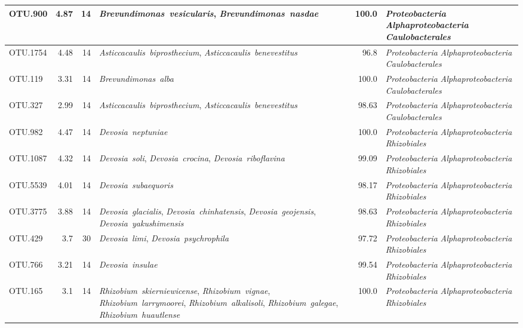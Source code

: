 \begin{ThreePartTable}
\begin{longtable}{lrrP{5cm}rP{5cm}}
OTU.900 & 4.87 & 14 & \mbox{\textit{Brevundimonas vesicularis}}, \mbox{\textit{Brevundimonas nasdae}} & 100.0 & \mbox{\textit{Proteobacteria}} \mbox{\textit{Alphaproteobacteria}} \mbox{\textit{Caulobacterales}} \\ \midrule
OTU.1754 & 4.48 & 14 & \mbox{\textit{Asticcacaulis biprosthecium}}, \mbox{\textit{Asticcacaulis benevestitus}} & 96.8 & \mbox{\textit{Proteobacteria}} \mbox{\textit{Alphaproteobacteria}} \mbox{\textit{Caulobacterales}} \\ \midrule
OTU.119 & 3.31 & 14 & \mbox{\textit{Brevundimonas alba}} & 100.0 & \mbox{\textit{Proteobacteria}} \mbox{\textit{Alphaproteobacteria}} \mbox{\textit{Caulobacterales}} \\ \midrule
OTU.327 & 2.99 & 14 & \mbox{\textit{Asticcacaulis biprosthecium}}, \mbox{\textit{Asticcacaulis benevestitus}} & 98.63 & \mbox{\textit{Proteobacteria}} \mbox{\textit{Alphaproteobacteria}} \mbox{\textit{Caulobacterales}} \\ \midrule
OTU.982 & 4.47 & 14 & \mbox{\textit{Devosia neptuniae}} & 100.0 & \mbox{\textit{Proteobacteria}} \mbox{\textit{Alphaproteobacteria}} \mbox{\textit{Rhizobiales}} \\ \midrule
OTU.1087 & 4.32 & 14 & \mbox{\textit{Devosia soli}}, \mbox{\textit{Devosia crocina}}, \mbox{\textit{Devosia riboflavina}} & 99.09 & \mbox{\textit{Proteobacteria}} \mbox{\textit{Alphaproteobacteria}} \mbox{\textit{Rhizobiales}} \\ \midrule
OTU.5539 & 4.01 & 14 & \mbox{\textit{Devosia subaequoris}} & 98.17 & \mbox{\textit{Proteobacteria}} \mbox{\textit{Alphaproteobacteria}} \mbox{\textit{Rhizobiales}} \\ \midrule
OTU.3775 & 3.88 & 14 & \mbox{\textit{Devosia glacialis}}, \mbox{\textit{Devosia chinhatensis}}, \mbox{\textit{Devosia geojensis}}, \mbox{\textit{Devosia yakushimensis}} & 98.63 & \mbox{\textit{Proteobacteria}} \mbox{\textit{Alphaproteobacteria}} \mbox{\textit{Rhizobiales}} \\ \midrule
OTU.429 & 3.7 & 30 & \mbox{\textit{Devosia limi}}, \mbox{\textit{Devosia psychrophila}} & 97.72 & \mbox{\textit{Proteobacteria}} \mbox{\textit{Alphaproteobacteria}} \mbox{\textit{Rhizobiales}} \\ \midrule
OTU.766 & 3.21 & 14 & \mbox{\textit{Devosia insulae}} & 99.54 & \mbox{\textit{Proteobacteria}} \mbox{\textit{Alphaproteobacteria}} \mbox{\textit{Rhizobiales}} \\ \midrule
OTU.165 & 3.1 & 14 & \mbox{\textit{Rhizobium skierniewicense}}, \mbox{\textit{Rhizobium vignae}}, \mbox{\textit{Rhizobium larrymoorei}}, \mbox{\textit{Rhizobium alkalisoli}}, \mbox{\textit{Rhizobium galegae}}, \mbox{\textit{Rhizobium huautlense}} & 100.0 & \mbox{\textit{Proteobacteria}} \mbox{\textit{Alphaproteobacteria}} \mbox{\textit{Rhizobiales}} \\ \midrule

\end{longtable}
\end{ThreePartTable}
